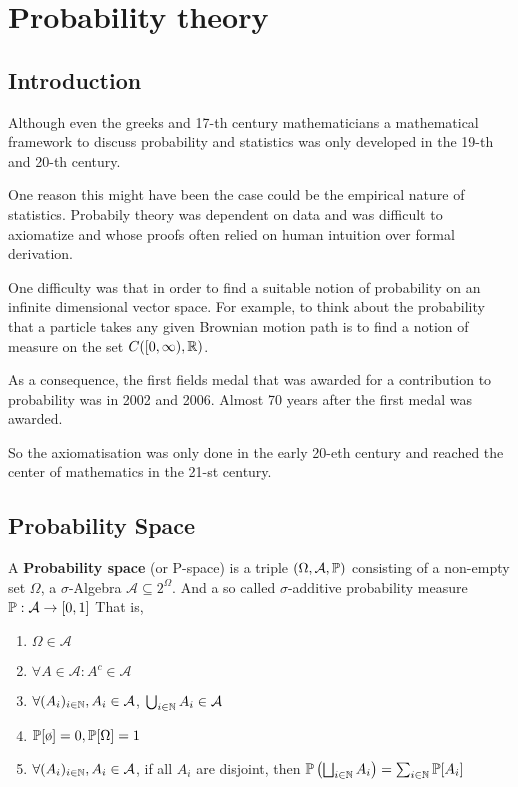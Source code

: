 \section{Probability theory}
\subsection{Introduction}

Although even the greeks and 17-th century mathematicians 
a mathematical framework to discuss probability and statistics was only developed in the 19-th and 20-th century.

One reason this might have been the case could be the empirical nature of statistics. 
Probabily theory was dependent on data and was difficult to axiomatize and whose proofs often relied on human intuition over formal derivation.

One difficulty was that in order to find a suitable notion of probability on an infinite dimensional vector space.
For example, to think about the probability that a particle takes any given Brownian motion path is to find a notion of measure on the set $C([0,\infty), \mathbb{R})$.

As a consequence, the first fields medal that was awarded for a contribution to probability was in 2002 and 2006. Almost 70 years after the first medal was awarded.

So the axiomatisation was only done in the early 20-eth century and reached the center of mathematics in the 21-st century.


\subsection{Probability Space}

\begin{dfn}
  A \textbf{Probability space} (or P-space) is a triple $(\Omega,\mathcal{A}, \mathbb{P})$ consisting of a non-empty set $\Omega$, a $\sigma$-Algebra $\mathcal{A} \subseteq 2^{\Omega}$. And a so called $\sigma$-additive probability measure $\mathbb{P}: \mathcal{A} \to [0,1]$
  That is,
  \begin{enumerate}
    \item $\Omega \in \mathcal{A}$
    \item $\forall A \in \mathcal{A}: A^{c} \in \mathcal{A}$
    \item $\forall (A_i)_{i \in \mathbb{N}}, A_i \in \mathcal{A}$, $\bigcup_{i \in \mathbb{N}} A_i \in \mathcal{A}$
    \item $\IP[\es] = 0, \IP[\Omega] = 1$
    \item $\forall (A_i)_{i \in \mathbb{N}}, A_i \in \mathcal{A}$, if all $A_i$ are disjoint, then
      $\mathbb{P}\left(\bigsqcup_{i \in \mathbb{N}} A_i\right) = \sum_{i \in \mathbb{N}} \mathbb{P}[A_i]$
  \end{enumerate}
\end{dfn}

